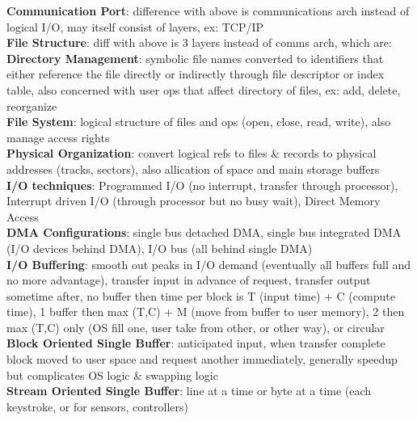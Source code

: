 \documentclass[a4paper]{article}
\begin{document}
\begin{multicols}{2}
        \textbf{Communication Port}: difference with above is communications arch instead of logical I/O, may itself consist of layers, ex: TCP/IP\\
        \textbf{File Structure}: diff with above is 3 layers instead of comms arch, which are:\\
        \textbf{Directory Management}: symbolic file names converted to identifiers that either reference the file directly or indirectly through file descriptor or index table, also concerned with user ops that affect directory of files, ex: add, delete, reorganize\\
        \textbf{File System}: logical structure of files and ops (open, close, read, write), also manage access rights\\
        \textbf{Physical Organization}: convert logical refs to files \& records to physical addresses (tracks, sectors), also allication of space and main storage buffers\\
        \textbf{I/O techniques}: Programmed I/O (no interrupt, transfer through processor), Interrupt driven I/O (through processor but no busy wait), Direct Memory Access\\
        \textbf{DMA Configurations}: single bus detached DMA, single bus integrated DMA (I/O devices behind DMA), I/O bus (all behind single DMA)\\
        \textbf{I/O Buffering}: smooth out peaks in I/O demand (eventually all buffers full and no more advantage), transfer input in advance of request, transfer output sometime after, no buffer then time per block is T (input time) + C (compute time), 1 buffer then max (T,C) + M (move from buffer to user memory), 2 then max (T,C) only (OS fill one, user take from other, or other way), or circular\\
        \textbf{Block Oriented Single Buffer}: anticipated input, when transfer complete block moved to user space and request another immediately, generally speedup but complicates OS logic \& swapping logic\\
        \textbf{Stream Oriented Single Buffer}: line at a time or byte at a time (each keystroke, or for sensors, controllers)\\
    \end{multicols}
    
\end{document}
